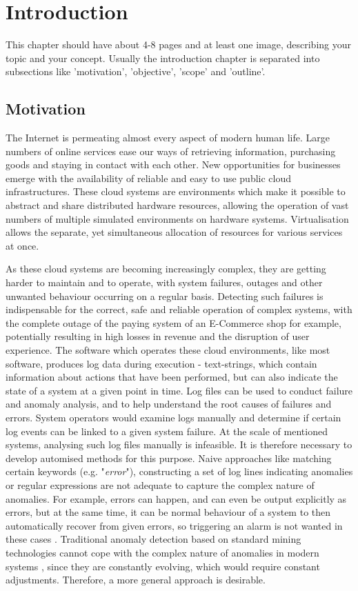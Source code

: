 \chapter{Introduction\label{cha:introduction}}

This chapter should have about 4-8 pages and at least one image, describing your topic and your concept. Usually the introduction chapter is separated into subsections like 'motivation', 'objective', 'scope' and 'outline'.

\section{Motivation\label{sec:motivation}}
The Internet is permeating almost every aspect of modern human life. Large numbers of online services ease our ways of retrieving information, purchasing goods and staying in contact with each other. New opportunities for businesses emerge with the availability of reliable and easy to use public cloud infrastructures. These cloud systems are environments which make it possible to abstract and share distributed hardware resources, allowing the operation of vast numbers of multiple simulated environments on hardware systems. Virtualisation allows the separate, yet simultaneous allocation of resources for various services at once.

As these cloud systems are becoming increasingly complex, they are getting harder to maintain and to operate, with system failures, outages and other unwanted behaviour occurring on a regular basis. Detecting such failures is indispensable for the correct, safe and reliable operation of complex systems, with the complete outage of the paying system of an E-Commerce shop for example, potentially resulting in high losses in revenue and the disruption of user experience. The software which operates these cloud environments, like most software, produces log data during execution - text-strings, which contain information about actions that have been performed, but can also indicate the state of a system at a given point in time. Log files can be used to conduct failure and anomaly analysis, and to help understand the root causes of failures and errors. System operators would examine logs manually and determine if certain log events can be linked to a given system failure. At the scale of mentioned systems, analysing such log files manually is infeasible. It is therefore necessary to develop automised methods for this purpose. Naive approaches like matching certain keywords (e.g. "\textit{error}"), constructing a set of log lines indicating anomalies or regular expressions are not adequate to capture the complex nature of anomalies. For example, errors can happen, and can even be output explicitly as errors, but at the same time, it can be normal behaviour of a system to then automatically recover from given errors, so triggering an alarm is not wanted in these cases \cite{meng2019loganomaly}. Traditional anomaly detection based on standard mining technologies cannot cope with the complex nature of anomalies in modern systems \cite{du2017deeplog}, since they are constantly evolving, which would require constant adjustments. Therefore, a more general approach is desirable.

